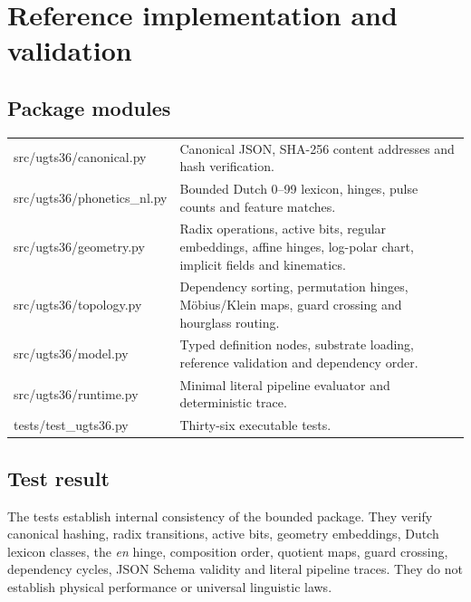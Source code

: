 \documentclass[10pt,a4paper]{article}
\begin{document}
\section{Reference implementation and validation}

\subsection{Package modules}
\begin{center}
\begin{tabularx}{0.98\textwidth}{>{\ttfamily\scriptsize\raggedright\arraybackslash}p{4.6cm}X}
\toprule
src/ugts36/canonical.py & Canonical JSON, SHA-256 content addresses and hash verification. \\
src/ugts36/\allowbreak phonetics\_nl.py & Bounded Dutch 0--99 lexicon, hinges, pulse counts and feature matches. \\
src/ugts36/geometry.py & Radix operations, active bits, regular embeddings, affine hinges, log-polar chart, implicit fields and kinematics. \\
src/ugts36/topology.py & Dependency sorting, permutation hinges, Möbius/Klein maps, guard crossing and hourglass routing. \\
src/ugts36/model.py & Typed definition nodes, substrate loading, reference validation and dependency order. \\
src/ugts36/runtime.py & Minimal literal pipeline evaluator and deterministic trace. \\
tests/\allowbreak test\_ugts36.py & Thirty-six executable tests. \\
\bottomrule
\end{tabularx}
\end{center}

\subsection{Test result}

The tests establish internal consistency of the bounded package. They verify canonical hashing, radix transitions, active bits, geometry embeddings, Dutch lexicon classes, the \emph{en} hinge, composition order, quotient maps, guard crossing, dependency cycles, JSON Schema validity and literal pipeline traces. They do not establish physical performance or universal linguistic laws.
\end{document}
